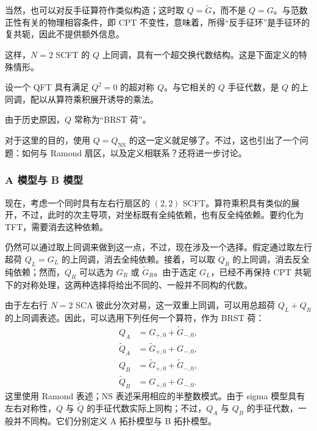 当然，也可以对反手征算符作类似构造；这时取 $Q=\widetilde G$，而不是 $Q=G$。与范数正性有关的物理相容条件，即 CPT 不变性，意味着，所得“反手征环”是手征环的复共轭，因此不提供额外信息。

这样，$N=2$ SCFT 的 $Q$ 上同调，具有一个超交换代数结构。这是下面定义的特殊情形。
\begin{definition}\label{def:3.2}
设一个 QFT 具有满足 $Q^2=0$ 的超对称 $Q$。与它相关的 $Q$ 手征代数，是 $Q$ 的上同调，配以从算符乘积展开诱导的乘法。
\end{definition}

由于历史原因，$Q$ 常称为“BRST 荷”。

对于这里的目的，使用 $Q=Q_{\mathrm{NS}}$ 的这一定义就足够了。不过，这也引出了一个问题：如何与 Ramond 扇区，以及定义相联系？还将进一步讨论。

\subsubsection{A 模型与 B 模型}\label{sec:3.3.4.4}

现在，考虑一个同时具有左右行扇区的 $(2,2)$ SCFT。算符乘积具有类似的展开，不过，此时的次主导项，对坐标既有全纯依赖，也有反全纯依赖。要约化为 TFT，需要消去这种依赖。

仍然可以通过取上同调来做到这一点，不过，现在涉及一个选择。假定通过取左行超荷 $Q_L=G_L$ 的上同调，消去全纯依赖。接着，可以取 $Q_R$ 的上同调，消去反全纯依赖；然而，$Q_R$ 可以选为 $G_R$ 或 $\widetilde G_R$。由于选定 $G_L$，已经不再保持 CPT 共轭下的对称处理，这两种选择将给出不同的、一般并不同构的代数。

由于左右行 $N=2$ SCA 彼此分次对易，这一双重上同调，可以用总超荷 $Q_L+Q_R$ 的上同调表述。因此，可以选用下列任何一个算符，作为 BRST 荷：
\begin{equation}\label{eq:3.100}
\begin{aligned}
Q_A&=G_{+,0}+\widetilde G_{-,0},\\
\widetilde Q_A&=\widetilde G_{+,0}+G_{-,0},\\
Q_B&=\widetilde G_{+,0}+\widetilde G_{-,0},\\
\widetilde Q_B&=G_{+,0}+G_{-,0}.
\end{aligned}
\end{equation}
这里使用 Ramond 表述；NS 表述采用相应的半整数模式。由于 sigma 模型具有左右对称性，$Q$ 与 $\widetilde Q$ 的手征代数实际上同构；不过，$Q_A$ 与 $Q_B$ 的手征代数，一般并不同构。它们分别定义 A 拓扑模型与 B 拓扑模型。

